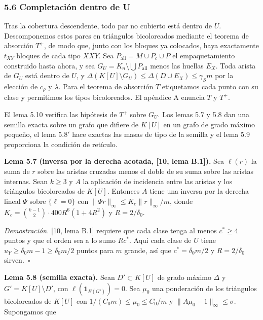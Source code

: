 \documentclass[spanish,11pt,a4paper]{article}
\begin{document}
\subsubsection{5.6 Completación dentro de U}\label{completaciuxf3n-dentro-de-u}

Tras la cobertura descendente, todo par no cubierto está dentro de \(U\). Descomponemos estos pares en triángulos bicoloreados mediante el teorema de absorción \(T^+\), de modo que, junto con los bloques ya colocados, haya exactamente \(t_{XY}\) bloques de cada tipo \(XXY\). Sea \(P_{\mathrm{all}}=M\cup P_c\cup P\) el empaquetamiento construido hasta ahora, y sea \(G_U=K_n\setminus\bigcup P_{\mathrm{all}}\) menos las huellas \(E_X\). Toda arista de \(G_U\) está dentro de \(U\), y \(\Delta(K[U]\setminus G_U)\le\Delta(D\cup E_X)\le\gamma_Sm\) por la elección de \(c_\rho\) y \(\lambda\). Para el teorema de absorción \(T\) etiquetamos cada punto con su clase y permitimos los tipos bicoloreados. El apéndice A enuncia \(T\) y \(T^+\).

El lema 5.10 verifica las hipótesis de \(T^+\) sobre \(G_U\). Los lemas 5.7 y 5.8 dan una semilla exacta sobre un grafo que difiere de \(K[U]\) en un grafo de grado máximo pequeño, el lema 5.8\('\) hace exactas las masas de tipo de la semilla y el lema 5.9 proporciona la condición de retículo.

\textbf{Lema 5.7 (inversa por la derecha acotada, {[}10, lema B.1{]}).} Sea \(\ell(r)\) la suma de \(r\) sobre las aristas cruzadas menos el doble de su suma sobre las aristas internas. Sean \(k\ge3\) y \(A\) la aplicación de incidencia entre las aristas y los triángulos bicoloreados de \(K[U]\). Entonces \(A\) tiene una inversa por la derecha lineal \(\Psi\) sobre \(\{\ell=0\}\) con \(\|\Psi r\|_\infty\le K_c\|r\|_\infty/m\), donde \(K_c=\binom{k-1}{2}\cdot400R^6(1+4R^2)\) y \(R=2/\delta_0\).

\emph{Demostración.} {[}10, lema B.1{]} requiere que cada clase tenga al menos \(c^*\ge4\) puntos y que el orden sea a lo sumo \(Rc^*\). Aquí cada clase de \(U\) tiene \(u_Y\ge\delta_0m-1\ge\delta_0m/2\) puntos para \(m\) grande, así que \(c^*=\delta_0m/2\) y \(R=2/\delta_0\) sirven.~\(\square\)

\textbf{Lema 5.8 (semilla exacta).} Sean \(D'\subset K[U]\) de grado máximo \(\Delta\) y \(G'=K[U]\setminus D'\), con \(\ell(\mathbf 1_{E(G')})=0\). Sea \(\mu_0\) una ponderación de los triángulos bicoloreados de \(K[U]\) con \(1/(C_0m)\le\mu_0\le C_0/m\) y \(\|A\mu_0-1\|_\infty\le\sigma\). Supongamos que
\end{document}
